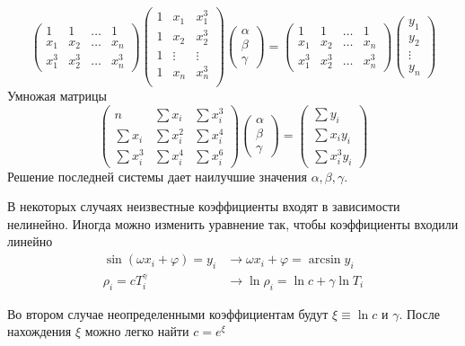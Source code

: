 \documentclass[professionalfonts,compress,unicode]{beamer}
\begin{document}
{
	$$
	\begin{pmatrix}
		1&1&\dots&1\\
		x_1&x_2&\dots&x_n\\
		x_1^3&x_2^3&\dots&x_n^3
	\end{pmatrix}
	\begin{pmatrix}
		1&x_1&x_1^3\\
		1&x_2&x_2^3\\
		1&\vdots&\vdots\\
		1&x_n&x_n^3\\
	\end{pmatrix}
	\begin{pmatrix}
		\alpha\\\beta\\\gamma
	\end{pmatrix} = 
	\begin{pmatrix}
		1&1&\dots&1\\
		x_1&x_2&\dots&x_n\\
		x_1^3&x_2^3&\dots&x_n^3
	\end{pmatrix}
	\begin{pmatrix}
		y_1\\y_2\\\vdots\\y_n
	\end{pmatrix}
	$$
	Умножая матрицы
	$$
	\begin{pmatrix}
		n & \sum x_i & \sum x_i^3\\
		\sum x_i & \sum x_i^2 & \sum x_i^4\\
		\sum x_i^3 & \sum x_i^4 & \sum x_i^6
	\end{pmatrix}
	\begin{pmatrix}
		\alpha\\\beta\\\gamma
	\end{pmatrix} = 
	\begin{pmatrix}
		\sum y_i\\
		\sum x_i y_i\\
		\sum x_i^3 y_i
	\end{pmatrix}
	$$
	Решение последней системы дает наилучшие значения $\alpha, \beta, \gamma$.
}

{
	В некоторых случаях неизвестные коэффициенты входят в зависимости нелинейно.
	Иногда можно изменить уравнение так, чтобы коэффициенты входили линейно
	\begin{align*}
	\sin (\omega x_i + \varphi) = y_i &\rightarrow 
		\omega x_i + \varphi = \arcsin y_i\\
	\rho_i = c T_i^\gamma &\rightarrow
		\ln \rho_i = \ln c + \gamma \ln T_i
	\end{align*}

	Во втором случае неопределенными коэффициентам будут $\xi \equiv \ln c$ и $\gamma$.
	После нахождения $\xi$ можно легко найти $c = e^\xi$
}
\end{document}
